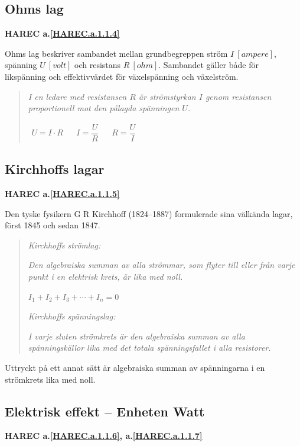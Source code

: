 \subsection{Ohms lag}
\textbf{HAREC a.\ref{HAREC.a.1.1.4}\label{myHAREC.a.1.1.4}}

Ohms lag beskriver sambandet mellan grundbegreppen ström \(I\ [ampere]\),
spänning \(U\ [volt]\) och resistans \(R\ [ohm]\).
Sambandet gäller både för likspänning och effektivvärdet för växelspänning och
växelström.

\begin{quote}
\emph{I en ledare med resistansen \(R\) är strömstyrkan \(I\) genom resistansen
proportionell mot den pålagda spänningen \(U\).}

\(
\begin{array}{lllll}U=I \cdot R & & I=\dfrac{U}{R} & & R=\dfrac{U}{I}\end{array}
\)
\end{quote}

\subsection{Kirchhoffs lagar}
\textbf{HAREC a.\ref{HAREC.a.1.1.5}\label{myHAREC.a.1.1.5}}

Den tyske fysikern G R Kirchhoff (1824--1887) formulerade sina välkända lagar,
först 1845 och sedan 1847.

\begin{quote}
\emph{Kirchhoffs strömlag:}

\emph{Den algebraiska summan av alla strömmar, som flyter till eller från varje punkt
i en elektrisk krets, är lika med noll.}

\(I_1 + I_2 + I_3 + \cdots + I_n = 0\)

\emph{Kirchhoffs spänningslag:}

\emph{I varje sluten strömkrets är den algebraiska summan av alla spänningskällor lika
med det totala spänningsfallet i alla resistorer.}
\end{quote}

Uttryckt på ett annat sätt är algebraiska summan av spänningarna i en
strömkrets lika med noll.

\subsection{Elektrisk effekt -- Enheten Watt}
\textbf{HAREC a.\ref{HAREC.a.1.1.6}\label{myHAREC.a.1.1.6}, a.\ref{HAREC.a.1.1.7}\label{myHAREC.a.1.1.7}}

